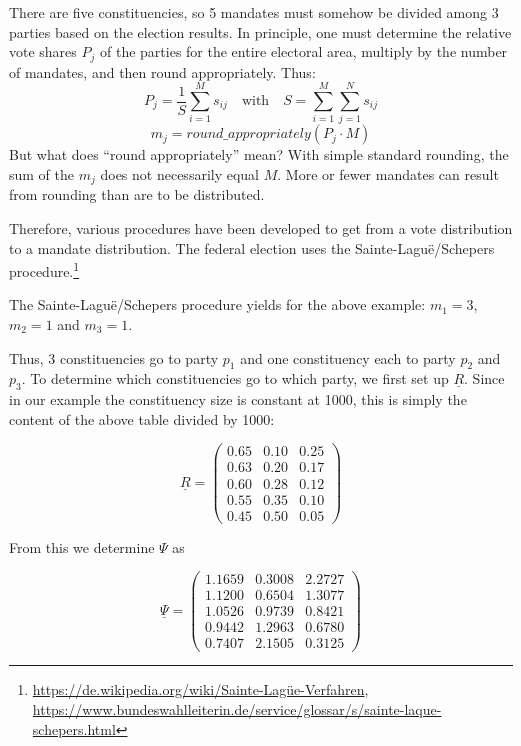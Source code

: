 There are five constituencies, so 5 mandates must somehow be divided among
3 parties based on the election results. In principle, one must determine the relative vote shares $P_j$ of the
parties for the entire electoral area, multiply by the number of mandates,
and then round appropriately. Thus:
\[
  P_j = \frac{1}{S}\sum_{i=1}^{M} s_{ij}
  \quad \text{with} \quad S = \sum_{i=1}^{M}\sum_{j=1}^{N} s_{ij}
\]
\[
  m_j = \textit{round\_appropriately}(P_j \cdot M)
\]
But what does \enquote{round appropriately} mean? With simple standard rounding, the sum of the
$m_j$ does not necessarily equal $M$. More or fewer mandates can result from rounding than
are to be distributed.

Therefore, various procedures have been developed to get from a vote distribution to a
mandate distribution. The federal election uses the Sainte-Laguë/Schepers procedure.\footnote{\url{https://de.wikipedia.org/wiki/Sainte-Lagüe-Verfahren},
\url{https://www.bundeswahlleiterin.de/service/glossar/s/sainte-laque-schepers.html}}

The Sainte-Laguë/Schepers procedure yields for the above example:
$m_1 = 3$, $m_2 = 1$ and $m_3 = 1$.

Thus, 3 constituencies go to party $p_1$ and one constituency each to party $p_2$ and $p_3$. To
determine which constituencies go to which party, we first set up $\underline{R}$.
Since in our example the constituency size is constant at 1000, this is simply the content
of the above table divided by 1000:

\[
  \underline{R} = \begin{pmatrix}
    0.65 & 0.10 & 0.25 \\
    0.63 & 0.20 & 0.17 \\
    0.60 & 0.28 & 0.12 \\
    0.55 & 0.35 & 0.10 \\
    0.45 & 0.50 & 0.05
  \end{pmatrix}
\]

From this we determine $\Psi$ as

\[
  \underline{\Psi} = \begin{pmatrix}
    1.1659 & 0.3008 & 2.2727 \\
    1.1200 & 0.6504 & 1.3077 \\
    1.0526 & 0.9739 & 0.8421 \\
    0.9442 & 1.2963 & 0.6780 \\
    0.7407 & 2.1505 & 0.3125
  \end{pmatrix}
\]

